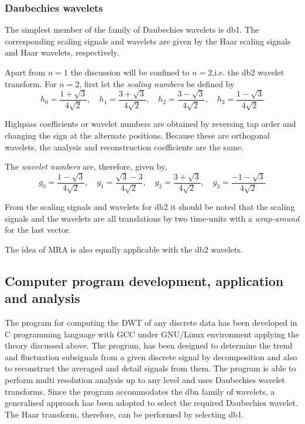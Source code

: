 \documentclass[a4paper,11pt]{report}
\begin{document}
\subsubsection{Daubechies wavelets}
The simplest member of the family of Daubechies wavelets is db1. The corresponding scaling signals and wavelets are given by the Haar scaling signals and Haar wavelets, respectively.

Apart from $n=1$ the discussion will be confined to $n=2$,i.e. the db2 wavelet transform. For $n=2$, first let the \emph{scaling numbers} be defined by
\begin{equation}
h_{0}=\frac{1+\sqrt{3}}{4\sqrt{2}}, \quad h_{1}=\frac{3+\sqrt{3}}{4\sqrt{2}}, \quad h_{2}=\frac{3-\sqrt{3}}{4\sqrt{2}}, \quad h_{3}=\frac{1-\sqrt{3}}{4\sqrt{2}}
\end{equation}

Highpass coefficients or wavelet numbers are obtained by reversing tap order and changing the sign at the alternate positions. Because these are orthogonal wavelets, the analysis and reconstruction coefficients are the same.

The \emph{wavelet numbers} are, therefore, given by,
\begin{equation}
g_{0}=\frac{1-\sqrt{3}}{4\sqrt{2}}, \quad g_{1}=\frac{\sqrt{3}-3}{4\sqrt{2}}, \quad g_{2}=\frac{3+\sqrt{3}}{4\sqrt{2}}, \quad g_{3}=\frac{-1-\sqrt{3}}{4\sqrt{2}}
\end{equation}

From the scaling signals and wavelets for db2 it should be noted that the scaling signals and the wavelets are all translations by two time-units with a \emph{wrap-around} for the last vector.

The idea of MRA is also equally applicable with the db2 wavelets. \cite{walker}

\subsection{Computer program development, application and analysis}
The program for computing the DWT of any discrete data has been developed in C programming language with GCC under GNU/Linux environment applying the theory discussed above. The program, has been designed to determine the trend and fluctuation subsignals from a given discrete signal by decomposition and also to reconstruct the averaged and detail signals from them. The program is able to perform multi resolution analysis up to any level and uses Daubechies wavelet transforms. Since the program accommodates the dbn family of wavelets, a generalised approach has been adopted to select the required Daubechies wavelet. The Haar transform, therefore, can be performed by selecting db1.
\end{document}
